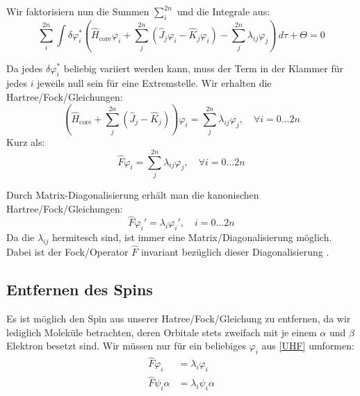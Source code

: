Wir faktorisiern nun die Summen $\sum_i^{2n}$ und die Integrale aus:
\begin{equation*}
  \sum_i^{2n} \int \delta \varphi_i^* \left(
    \hat{H}_{\text{core}} \varphi_i
  + \sum_j^{2n} \left(
    \hat{J}_j \varphi_i
    - \hat{K}_j \varphi_i
  \right) 
  - \sum_j^{2n}\lambda_{ij} \varphi_j \right) \,d\tau + \Theta
  = 0
\end{equation*}

Da jedes $\delta \varphi_i^*$ beliebig variiert werden kann,
muss der Term in der Klammer für jedes $i$ jeweils null sein für eine Extremstelle.
Wir erhalten die Hartree\-/Fock\-/Gleichungen:
\begin{equation}
  \left(\hat{H}_{\text{core}} + \sum_j^{2n} 
  \left( \hat{J}_j - \hat{K}_j \right)\right) \varphi_i = 
  \sum_j^{2n}\lambda_{ij} \varphi_j, \quad \forall i = 0 \dots 2n\nonumber
\end{equation}
Kurz als:
\begin{equation}
  \hat{F}\varphi_i = \sum_j^{2n}\lambda_{ij} \varphi_j, \quad \forall i = 0 \dots 2n
\end{equation}

Durch Matrix-Diagonalisierung erhält man die kanonischen Hartree\-/Fock\-/Gleichungen:
\begin{equation} \label{UHF}
  \hat{F} \varphi_i' = \lambda_i \varphi_i', \quad i = 0 \dots 2n
\end{equation}
Da die $\lambda_{ij}$ hermitesch sind, ist immer eine Matrix\-/Diagonalisierung möglich.
Dabei ist der Fock\-/Operator $\hat{F}$ invariant bezüglich dieser Diagonalisierung
\cite[3.64]{szabo_ostlund_1996}.

\cite[S. 253]{atkins_friedman_2011}
\cite[S. 115-119]{szabo_ostlund_1996}

\subsection{Entfernen des Spins}\label{remove-spin-section}
Es ist möglich den Spin aus unserer Hatree\-/Fock\-/Gleichung zu entfernen,
da wir lediglich Moleküle betrachten,
deren Orbitale stets zweifach mit je einem $\alpha$ und $\beta$ Elektron besetzt sind.
Wir müssen nur für ein beliebiges $\varphi_i$ aus \cref{UHF} umformen:
\begin{align*}
  \hat{F} \varphi_i &= \lambda_i \varphi_i \\
  \hat{F} \psi_i \alpha &= \lambda_i \psi_i \alpha
\end{align*}

